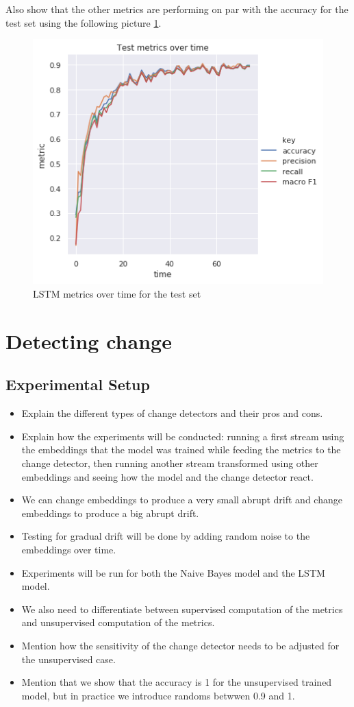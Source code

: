 \documentclass[12pt]{report}
\begin{document}
Also show that the other metrics are performing on par with the accuracy for the test set using the following picture \ref{fig:lstm-metrics}.

\begin{figure}[H]
\centering
\includegraphics[width=0.8\linewidth]{assets/framework/lstm_BERT_test_metrics_holdout.png}
\caption{LSTM metrics over time for the test set}
\label{fig:lstm-metrics}
\end{figure}

\chapter{Detecting change}

\section{Experimental Setup}

\begin{itemize}
    \item Explain the different types of change detectors and their pros and cons.
    \item Explain how the experiments will be conducted: running a first stream using the embeddings that the model was trained while feeding the metrics to the change detector, then running another stream transformed using other embeddings and seeing how the model and the change detector react.
    \item We can change embeddings to produce a very small abrupt drift and change embeddings to produce a big abrupt drift.
    \item Testing for gradual drift will be done by adding random noise to the embeddings over time.
    \item Experiments will be run for both the Naive Bayes model and the LSTM model.
    \item We also need to differentiate between supervised computation of the metrics and unsupervised computation of the metrics.
    \item Mention how the sensitivity of the change detector needs to be adjusted for the unsupervised case.
    \item Mention that we show that the accuracy is 1 for the unsupervised trained model, but in practice we introduce randoms betwwen 0.9 and 1.
\end{itemize}
\end{document}
